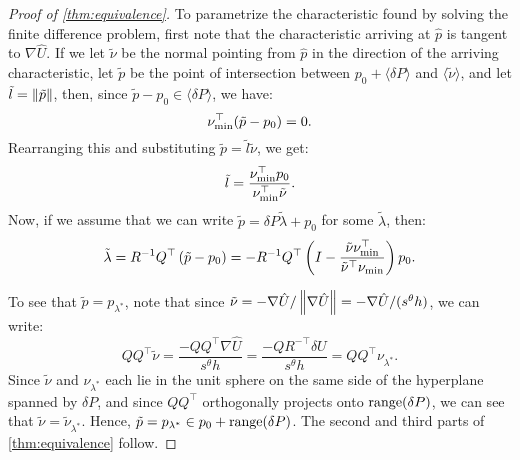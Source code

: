 \documentclass[sisc-eikonal.tex]{subfiles}
\begin{document}
\begin{proof}[Proof of \cref{thm:equivalence}]
  To parametrize the characteristic found by solving the finite
  difference problem, first note that the characteristic arriving at
  $\hat{p}$ is tangent to $\nabla \hat{U}$. If we let $\tilde{\nu}$ be the
  normal pointing from $\hat{p}$ in the direction of the arriving
  characteristic, let $\tilde{p}$ be the point of intersection between
  $p_0 + \langle \delta P \rangle$ and $\langle \tilde{\nu} \rangle$,
  and let $\tilde{l} = \left\|\tilde{p}\right\|$, then, since
  $\tilde{p} - p_0 \in \langle \delta P \rangle$, we have:
  \begin{equation}
    \nu_{\operatorname{min}}^\top (\tilde{p} - p_0) = 0.
  \end{equation}
  Rearranging this and substituting
  $\tilde{p} = \tilde{l} \tilde{\nu}$, we get:
  \begin{equation}
    \tilde{l} = \frac{\nu_{\operatorname{min}}^\top p_0}{\nu_{\operatorname{min}}^\top \tilde{\nu}}.
  \end{equation}
  Now, if we assume that we can write
  $\tilde{p} = \delta P \tilde{\lambda} + p_0$ for some
  $\tilde{\lambda}$, then:
  \begin{equation}
    \tilde{\lambda} = R^{-1} Q^\top \left(\tilde{p} - p_0\right) = -R^{-1} Q^\top \left(I - \frac{\tilde{\nu} \nu_{\operatorname{min}}^\top}{\tilde{\nu}^\top \nu_{\operatorname{min}}}\right) p_0.
  \end{equation}

  To see that $\tilde{p} = p_{\lambda^*}$, note that since
  $\tilde{\nu} = -\nabla \hat{U}/\left\|\nabla \hat{U}\right\| = -\nabla
  \hat{U}/(s^\theta h)$, we can write:
  \begin{equation}
    QQ^\top \tilde{\nu} = \frac{-QQ^\top \nabla \hat{U}}{s^\theta h} = \frac{-QR^{-\top} \delta U}{s^\theta h} = QQ^\top \nu_{\lambda^*}.
  \end{equation}
  Since $\tilde{\nu}$ and $\nu_{\lambda^*}$ each lie in the unit
  sphere on the same side of the hyperplane spanned by $\delta P$, and
  since $QQ^\top$ orthogonally projects onto $\operatorname{range}(\delta P)$, we
  can see that $\tilde{\nu} = \tilde{\nu}_{\lambda^*}$. Hence,
  $\tilde{p} = p_{\lambda^*} \in p_0 + \operatorname{range}(\delta P)$. The second
  and third parts of \cref{thm:equivalence} follow.
\end{proof}
\end{document}

